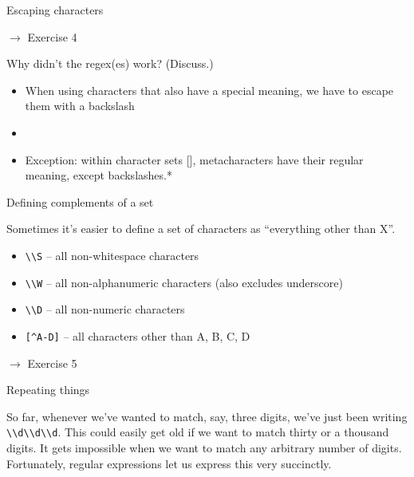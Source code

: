 \documentclass{beamer}
\begin{document}
\verbdef{\specialchartext}{\^ \$ \. \\}

\begin{frame}{Escaping characters}

$\rightarrow$ Exercise 4

\bigskip

Why didn't the regex(es) work? (Discuss.)

\begin{itemize}
 \item When using characters that also have a special meaning, we have to escape them with a backslash
 \item \specialchartext
 \item Exception: within character sets [], metacharacters have their regular meaning, except backslashes.*
\end{itemize}

\end{frame}

\begin{frame}{Defining complements of a set}

Sometimes it's easier to define a set of characters as ``everything other than X''.

\begin{itemize}
  \item \lstinline$\\S$ -- all non-whitespace characters
  \item \lstinline$\\W$ -- all non-alphanumeric characters (also excludes underscore)
  \item \lstinline$\\D$ -- all non-numeric characters
  \item \lstinline$[^A-D]$ -- all characters other than A, B, C, D
\end{itemize}

\bigskip
$\rightarrow$ Exercise 5

\end{frame}

\begin{frame}{Repeating things}

So far, whenever we've wanted to match, say, three digits, we've just been writing
\lstinline$\\d\\d\\d$. This could easily get old if we want to match thirty or a thousand digits.
It gets impossible when we want to match any arbitrary number of digits.
Fortunately, regular expressions let us express this very succinctly.

\end{frame}
\end{document}
